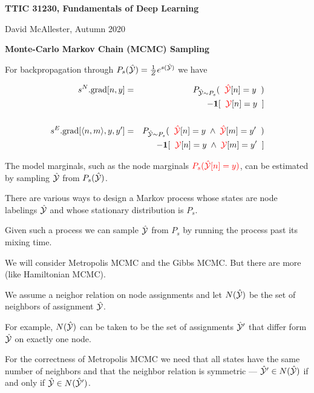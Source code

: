 




{\Huge

  \centerline{\bf TTIC 31230, Fundamentals of Deep Learning}
  \bigskip
  \centerline{David McAllester, Autumn 2020}
  \vfill
  \vfill
  \centerline{\bf Monte-Carlo Markov Chain (MCMC) Sampling}
\vfill
\vfill
\vfill


For backpropagation through $P_s(\hat{\cal Y}) = \frac{1}{Z} e^{s(\hat{\cal Y})}$ we have

\vfill
\begin{eqnarray*}
    s^N.\mathrm{grad}[n,y] & = &   P_{\hat{\cal Y} \sim P_s}(\;\;{\color{red} \hat{\cal Y}}[n] = y\;\;) \\
    & & \;\;\;\;\;- \mathbf{1}[\;\;{\color{red} {\cal Y}}[n] = y\;\;] \\
    \\
    s^E.\mathrm{grad}[{\mbox{$\langle n,m\rangle$}},y,y'] & = &  P_{\hat{\cal Y} \sim P_s}(\;\;{\color{red} \hat{\cal Y}}[n] = y \; \wedge \; {\color{red} \hat{\cal Y}}[m] = y'\;\;) \\
    & & \;\;\;\;\;- \mathbf{1}[\;\;{\color{red} {\cal Y}}[n] = y\; \wedge \; {\color{red} {\cal Y}}[m] = y'\;\;]
\end{eqnarray*}

The model marginals, such as the node marginals
 ${\color{red} P_s(\hat{\cal Y}[n]=y)}$, can be estimated by sampling $\hat{\cal Y}$ from $P_s(\hat{\cal Y})$.

\vfill
There are various ways to design a Markov process whose states are node labelings $\hat{\cal Y}$ and whose stationary distribution is $P_s$.

\vfill
Given such a process we can sample $\hat{\cal Y}$ from $P_s$ by running the process past its mixing time.

\vfill
We will consider Metropolis MCMC and the Gibbs MCMC.  But there are more (like Hamiltonian MCMC).


We assume a neighor relation on node assignments and let $N(\hat{\cal Y})$ be the set of neighbors of assignment $\hat{\cal Y}$.

\vfill
For example, $N(\hat{\cal Y})$ can be taken to be the set of assignments $\hat{\cal Y}'$ that differ form $\hat{\cal Y}$ on exactly one node.

\vfill
For the correctness of Metropolis MCMC we need that all states have the same number of neighbors and that the neighbor relation is symmetric ---
$\hat{\cal Y}' \in N(\hat{\cal Y})$ if and only if $\hat{\cal Y} \in N(\hat{\cal Y}')$.

}
